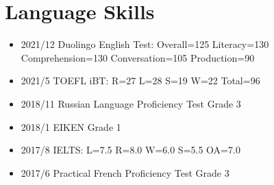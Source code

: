 \documentclass[12pt]{article}
\begin{document}
\section*{Language Skills}
  \begin{itemize}
    \item 2021/12 Duolingo English Test: Overall=125 Literacy=130 Comprehension=130 Conversation=105 Production=90
    \item 2021/5 TOEFL iBT: R=27 L=28 S=19 W=22 Total=96
    \item 2018/11 Russian Language Proficiency Test Grade 3
    \item 2018/1 EIKEN Grade 1
    \item 2017/8 IELTS: L=7.5 R=8.0 W=6.0 S=5.5 OA=7.0
    \item 2017/6 Practical French Proficiency Test Grade 3
  \end{itemize}
\end{document}
